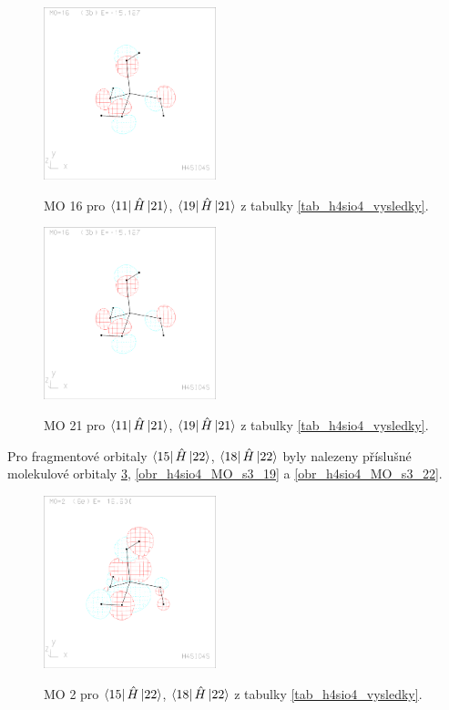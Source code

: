 \documentclass[
  digital, %
  table,   %
  lof,     %
  lot,     %
]{fithesis3}
\begin{document}
\begin{figure}[h]
\caption{MO 16 pro $\bra{11}{\hat{H}}\ket{21}$, $\bra{19}{\hat{H}}\ket{21}$ z tabulky \ref{tab_h4sio4_vysledky}.  }
  \center
  \includegraphics[width=5cm]{h4sio4_obrazky/s2_16.eps}
  \label{obr_h4sio4_MO_s2_16}
  \end{figure}

\begin{figure}[h]
\caption{MO 21 pro $\bra{11}{\hat{H}}\ket{21}$, $\bra{19}{\hat{H}}\ket{21}$ z tabulky \ref{tab_h4sio4_vysledky}.  }
  \center
  \includegraphics[width=5cm]{h4sio4_obrazky/s2_16.eps}
  \label{obr_h4sio4_MO_s2_21}
  \end{figure}
  
  Pro fragmentové orbitaly $\bra{15}{\hat{H}}\ket{22}$, $\bra{18}{\hat{H}}\ket{22}$ byly nalezeny příslušné molekulové orbitaly \ref{obr_h4sio4_MO_s3_2}, \ref{obr_h4sio4_MO_s3_19} a \ref{obr_h4sio4_MO_s3_22}.
  
  \begin{figure}[h]
\caption{MO 2 pro $\bra{15}{\hat{H}}\ket{22}$, $\bra{18}{\hat{H}}\ket{22}$ z tabulky \ref{tab_h4sio4_vysledky}.  }
  \center
  \includegraphics[width=5cm]{h4sio4_obrazky/s3__2.eps}
  \label{obr_h4sio4_MO_s3_2}
  \end{figure}
\end{document}
